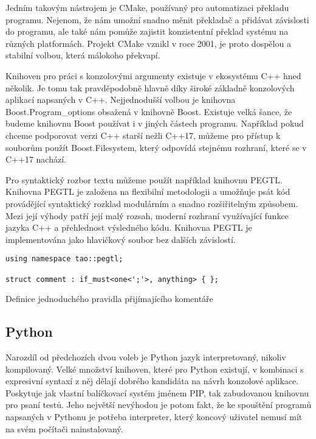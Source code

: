Jedním takovým nástrojem je CMake\cite{cmake}, používaný pro automatizaci překladu programu. Nejenom, že nám umožní snadno měnit překladač a přidávat závislosti do programu, ale také nám pomůže zajistit konzistentní překlad systému na různých platformách. Projekt CMake vznikl v roce 2001\cite{cmake-overview}, je proto dospělou a stabilní volbou, která málokoho překvapí.

Knihoven pro práci s konzolovými argumenty existuje v ekosystému C++ hned několik. Je tomu tak pravděpodobně hlavně díky široké základně konzolových aplikací napsaných v C++. Nejjednodušší volbou je knihovna Boost.Program\_options obsažená v knihovně Boost\cite{boost-filesystem}. Existuje velká šance, že budeme knihovnu Boost používat i v jiných částech programu. Například  pokud chceme podporovat verzi C++ starší nežli C++17\cite{cpp-filesystem}, můžeme pro přístup k souborům použít Boost.Filesystem, který odpovídá stejnému rozhraní, které se v C++17 nachází\cite{boost-filesystem}.

Pro syntaktický rozbor textu můžeme použít například knihovnu PEGTL\cite{github-pegtl}. Knihovna PEGTL je založena na flexibilní metodologii a umožňuje psát kód provádějící syntaktický rozklad modulárním a snadno rozšiřitelným způsobem. Mezi její výhody patří její malý rozsah, moderní rozhraní využívající funkce jazyka C++ a přehlednost výsledného kódu. Knihovna PEGTL je implementována jako hlavičkový soubor bez dalších závislostí\cite{github-pegtl}.

\begin{listing}
\begin{verbatim}
using namespace tao::pegtl;

struct comment : if_must<one<';'>, anything> { };
\end{verbatim}
\caption{Definice jednoduchého pravidla přijímajícího komentáře}
\label{fig:peg-example}
\end{listing}

\subsection{Python}

Narozdíl od předchozích dvou voleb je Python jazyk interpretovaný, nikoliv kompilovaný. Velké množství knihoven, které pro Python existují, v kombinaci s expresivní syntaxí z něj dělají dobrého kandidáta na návrh konzolové aplikace. Poskytuje jak vlastní balíčkovací systém jménem PIP\cite{pip}, tak zabudovanou knihovnu pro psaní testů\cite{python-unittest}. Jeho největší nevýhodou je potom fakt, že ke spouštění programů napsaných v Pythonu je potřeba interpreter, který koncový uživatel nemusí mít na svém počítači nainstalovaný.

